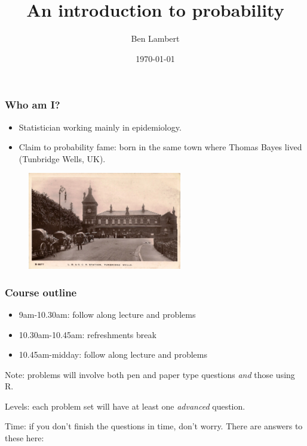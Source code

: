 \documentclass{beamer}
\title[Intro to probability]{An introduction to probability} %
\author{Ben Lambert} %
\institute[Univ. of Oxford] %
{
	University of Oxford \\ %
	\medskip
	\textit{ben.c.lambert@gmail.com} %
}
\date{\today} %
\begin{document}
	
	\begin{frame}
		\titlepage %
	\end{frame}

	\begin{frame}
		\frametitle{Who am I?}
		
		\begin{itemize}
			\item Statistician working mainly in epidemiology.
			\item Claim to probability fame: born in the same town where Thomas Bayes lived (Tunbridge Wells, UK).
		\end{itemize}
		
		\begin{figure}[ht]
			\centerline{\includegraphics[width=0.6\textwidth]{./figures/tunbridgeWells.jpg}}
		\end{figure}
		
	\end{frame}

	\begin{frame}
		\frametitle{Course outline}
		
		\begin{itemize}
			\item 9am-10.30am: follow along lecture and problems
			\item 10.30am-10.45am: refreshments break
			\item 10.45am-midday: follow along lecture and problems
		\end{itemize}
		
		\vspace{0.5cm}
		
		Note: problems will involve both pen and paper type questions \textit{and} those using R.
		
		Levels: each problem set will have at least one \textit{advanced} question.
		
		Time: if you don't finish the questions in time, don't worry. There are answers to these here: 
		
	\end{frame}
\end{document}
